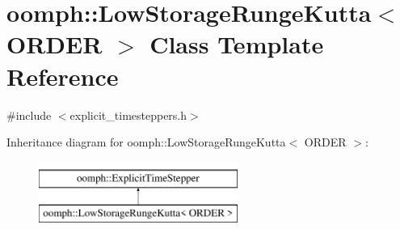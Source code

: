 \hypertarget{classoomph_1_1LowStorageRungeKutta}{}\section{oomph\+:\+:Low\+Storage\+Runge\+Kutta$<$ O\+R\+D\+ER $>$ Class Template Reference}
\label{classoomph_1_1LowStorageRungeKutta}


{\ttfamily \#include $<$explicit\+\_\+timesteppers.\+h$>$}

Inheritance diagram for oomph\+:\+:Low\+Storage\+Runge\+Kutta$<$ O\+R\+D\+ER $>$\+:\begin{figure}[H]
\begin{center}
\leavevmode
\includegraphics[height=2.000000cm]{classoomph_1_1LowStorageRungeKutta}
\end{center}
\end{figure}
